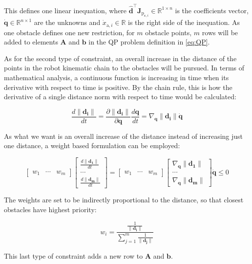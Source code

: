 This defines one linear inequation, where
$\hat{\mathbf{d}}^{\top} \mathbf{J}_{\mathrm{p}_{\mathbf{c}, i}} \in \mathbb{R}^{1 \times n}$
is the coefficients vector,
$\dot{\mathbf{q}} \in \mathbb{R}^{n \times 1}$
are the unknowns and
$\dot{x}_{\mathrm{a}, i} \in \mathbb{R}$
is the right side of the inequation. As one obstacle defines one new restriction, for $m$ obstacle points, $m$ rows will be added to elements $\mathbf{A}$ and $\mathbf{b}$ in the QP problem definition in \ref{eq:QP}.

As for the second type of constraint, an overall increase in the distance of the points in the robot kinematic chain to the obstacles will be pursued. In terms of mathematical analysis, a continuous function is increasing in time when its derivative with respect to time is positive. By the chain rule, this is how the derivative of a single distance norm with respect to time would be calculated:

\begin{equation*}
    \frac{ d \|\mathbf{d_i}\|}{dt} =
    \frac{ \partial \|\mathbf{d_i}\|}{\partial \mathbf{q}} \frac{d \mathbf{q}}{dt} =
    \nabla_{\mathbf{q}}\|\mathbf{d_i}\| \dot{\mathbf{q}}
\end{equation*}

As what we want is an overall increase of the distance instead of increasing just one distance, a weight based formulation can be employed:

\begin{equation*}
    \begin{bmatrix}
        w_1 & \cdots & w_m
    \end{bmatrix}
    \begin{bmatrix}
        \frac{ d \|\mathbf{d_1}\|}{dt} \\ \cdots \\ \frac{ d \|\mathbf{d_m}\|}{dt}
    \end{bmatrix}
    =
    \begin{bmatrix}
        w_1 & \cdots & w_m
    \end{bmatrix}
    \begin{bmatrix}
        \nabla_{\mathbf{q}}\|\mathbf{d_1}\| \\
        \cdots \\
        \nabla_{\mathbf{q}}\|\mathbf{d_m}\|
    \end{bmatrix}
    \dot{\mathbf{q}}
    \leq 0
\end{equation*}

The weights are set to be indirectly proportional to the distance, so that closest obstacles have highest priority:

\begin{equation*}
    w_i = \frac{\frac{1}{\|\mathbf{d_i}\|}}{\sum_{j=1}^{m} \frac{1}{\|\mathbf{d_j}\|}}
\end{equation*}

This last type of constraint adds a new row to $\mathbf{A}$ and $\mathbf{b}$.


